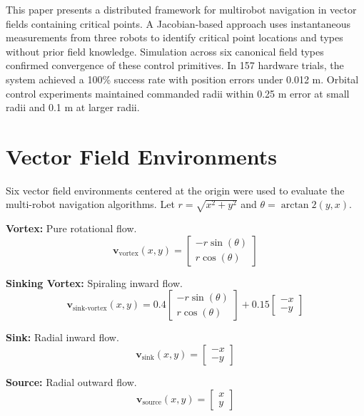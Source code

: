 \documentclass[lettersize,journal]{IEEEtran}
\begin{document}
This paper presents a distributed framework for multirobot navigation in vector fields containing critical points. A Jacobian-based approach uses instantaneous measurements from three robots to identify critical point locations and types without prior field knowledge. Simulation across six canonical field types confirmed convergence of these control primitives. In 157 hardware trials, the system achieved a 100\% success rate with position errors under 0.012 m. Orbital control experiments maintained commanded radii within 0.25 m error at small radii and 0.1 m at larger radii.


\appendices

\section{Vector Field Environments}
\label{sec:appendix_vector_fields}

Six vector field environments centered at the origin were used to evaluate the multi-robot navigation algorithms. Let $r = \sqrt{x^2 + y^2}$ and $\theta = \arctan2(y, x)$.

\textbf{Vortex:} Pure rotational flow.
\begin{equation}
\mathbf{v}_{\text{vortex}}(x, y) = \begin{bmatrix} -r \sin(\theta) \\ r \cos(\theta) \end{bmatrix}
\end{equation}

\textbf{Sinking Vortex:} Spiraling inward flow.
\begin{equation}
\mathbf{v}_{\text{sink-vortex}}(x, y) = 0.4 \begin{bmatrix} -r \sin(\theta) \\ r \cos(\theta) \end{bmatrix} + 0.15 \begin{bmatrix} -x \\ -y \end{bmatrix}
\end{equation}

\textbf{Sink:} Radial inward flow.
\begin{equation}
\mathbf{v}_{\text{sink}}(x, y) = \begin{bmatrix} -x \\ -y \end{bmatrix}
\end{equation}

\textbf{Source:} Radial outward flow.
\begin{equation}
\mathbf{v}_{\text{source}}(x, y) = \begin{bmatrix} x \\ y \end{bmatrix}
\end{equation}
\end{document}
